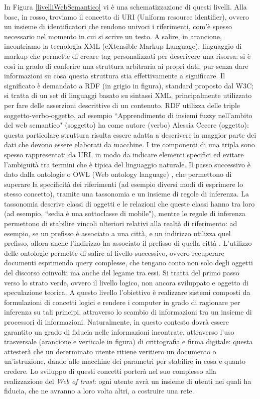 \documentclass[12pt,a4paper]{report}
\begin{document}
In Figura \ref{livelliWebSemantico} vi è una schematizzazione di questi livelli. 
Alla base, in rosso, troviamo il concetto di URI (Uniform resource identifier), ovvero un insieme di identificatori che rendono univoci i riferimenti, com'è spesso necessario nel momento in cui si scrive un testo.
A salire, in arancione, incontriamo la tecnologia XML \cite{xmlBook} (eXtensible Markup Language), linguaggio di markup che permette di creare tag personalizzati per descrivere una risorsa: si è così in grado di conferire una struttura arbitraria ai propri dati, pur senza dare informazioni su cosa questa struttura stia effettivamente a significare.
Il significato è demandato a RDF \cite{rdfBook} (in grigio in figura), standard proposto dal W3C; si tratta di un set di linguaggi basato su sintassi XML, principalmente utilizzato per fare delle asserzioni descrittive di un contenuto. RDF utilizza delle triple soggetto-verbo-oggetto, ad esempio ``Apprendimento di insiemi fuzzy nell'ambito del web semantico" (soggetto) ha come autore (verbo) Alessia Cecere (oggetto): questa particolare struttura risulta essere adatta a descrivere la maggior parte dei dati che devono essere elaborati da macchine.
I tre componenti di una tripla sono spesso rappresentati da URI, in modo da indicare elementi specifici ed evitare l'ambiguità tra termini che è tipica del linguaggio naturale.
Il passo successivo è dato dalla ontologie o OWL (Web ontology language) \cite{owlBook}, che permettono di superare la specificità dei riferimenti (ad esempio diversi modi di esprimere lo stesso concetto), tramite una tassonomia e un insieme di regole di inferenza. La tassonomia descrive classi di oggetti e le relazioni che queste classi hanno tra loro (ad esempio, ``sedia è una sottoclasse di mobile"), mentre le regole di inferenza permettono di stabilire vincoli ulteriori relativi alla realtà di riferimento: ad esempio, se un prefisso è associato a una città, e un indirizzo utilizza quel prefisso, allora anche l'indirizzo ha associato il prefisso di quella città \cite{semanticWebPaper}. 
L'utilizzo delle ontologie permette di salire al livello successivo, ovvero recuperare documenti esprimendo query complesse, che tengano conto non solo degli oggetti del discorso coinvolti ma anche del legame tra essi.
Si tratta del primo passo verso lo strato verde, ovvero il livello logico, non ancora sviluppato e oggetto di speculazione teorica. A questo livello l'obiettivo è realizzare sistemi composti da formulazioni di concetti logici e rendere i computer in grado di ragionare per inferenza su tali principi, attraverso lo scambio di informazioni tra un insieme di processori di informazioni. Naturalmente, in questo contesto dovrà essere garantito un grado di fiducia nelle informazioni incontrate, attraverso l'uso trasversale (arancione e verticale in figura) di crittografia e firma digitale: questa attesterà che un determinato utente ritiene veritiero un documento o un'istruzione, dando alle macchine dei parametri per stabilire in cosa e quanto credere.
Lo sviluppo di questi concetti porterà nel suo complesso alla realizzazione del \emph{Web of trust}: ogni utente avrà un insieme di utenti nei quali ha fiducia, che ne avranno a loro volta altri, a costruire una rete.
\end{document}
